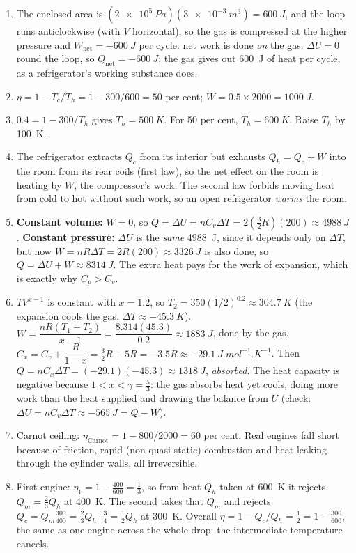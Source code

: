 {\begin{enumerate}[itemsep=2pt]
\item The enclosed area is $(\SI{2e5}{Pa})(\SI{3e-3}{m^3}) = \SI{600}{J}$, and the loop runs anticlockwise (with $V$ horizontal), so the gas is compressed at the higher pressure and $W_{\text{net}}=\SI{-600}{J}$ per cycle: net work is done \emph{on} the gas. $\Delta U = 0$ round the loop, so $Q_{\text{net}} = \SI{-600}{J}$: the gas gives out \SI{600}{J} of heat per cycle, as a refrigerator's working substance does.
\item $\eta = 1 - T_c/T_h = 1-300/600 = 50$ per cent; $W = 0.5\times2000 = \SI{1000}{J}$.
\item $0.4 = 1 - 300/T_h$ gives $T_h = \SI{500}{K}$. For 50 per cent, $T_h = \SI{600}{K}$. Raise
      $T_h$ by \SI{100}{K}.
\item The refrigerator extracts $Q_c$ from its interior but exhausts $Q_h=Q_c + W$ into the room from its
      rear coils (first law), so the net effect on the room is heating by $W$, the compressor's work. The
      second law forbids moving heat from cold to hot without such work, so an open refrigerator
      \emph{warms} the room.
\item \textbf{Constant volume:} $W=0$, so $Q = \Delta U = nC_v\Delta T = 2(\tfrac32R)(200)
      \approx \SI{4988}{J}$. \textbf{Constant pressure:} $\Delta U$ is the \emph{same} \SI{4988}{J}, since
      it depends only on $\Delta T$, but now $W = nR\Delta T = 2R(200) \approx \SI{3326}{J}$ is also done,
      so $Q = \Delta U + W \approx \SI{8314}{J}$. The extra heat pays for the work of expansion, which is
      exactly why $C_p > C_v$.
\item $TV^{x-1}$ is constant with $x=1.2$, so $T_2 = 350(1/2)^{0.2} \approx \SI{304.7}{K}$ (the expansion
      cools the gas, $\Delta T\approx\SI{-45.3}{K}$). $W = \dfrac{nR(T_1-T_2)}{x-1} = \dfrac{8.314(45.3)}{0.2}
      \approx \SI{1883}{J}$, done by the gas. $C_x = C_v + \dfrac{R}{1-x} = \tfrac32R - 5R = -3.5R
      \approx \SI{-29.1}{J.mol^{-1}.K^{-1}}$. Then $Q = nC_x\Delta T = (-29.1)(-45.3)\approx\SI{1318}{J}$,
      \emph{absorbed}. The heat capacity is negative because $1<x<\gamma=\tfrac53$: the gas absorbs heat yet
      cools, doing more work than the heat supplied and drawing the balance from $U$ (check:
      $\Delta U=nC_v\Delta T\approx\SI{-565}{J}=Q-W$).
\item Carnot ceiling: $\eta_{\text{Carnot}} = 1 - 800/2000 = 60$ per cent. Real engines fall short because of
      friction, rapid (non-quasi-static) combustion and heat leaking through the cylinder walls, all
      irreversible.
\item First engine: $\eta_1 = 1 - \tfrac{400}{600}=\tfrac13$, so from heat $Q_h$ taken at \SI{600}{K} it
      rejects $Q_m = \tfrac23 Q_h$ at \SI{400}{K}. The second takes that $Q_m$ and rejects
      $Q_c = Q_m\tfrac{300}{400} = \tfrac23 Q_h\cdot\tfrac34 = \tfrac12 Q_h$ at \SI{300}{K}. Overall
      $\eta = 1 - Q_c/Q_h = \tfrac12 = 1 - \tfrac{300}{600}$, the same as one engine across the whole
      drop: the intermediate temperature cancels.
\end{enumerate}
}

